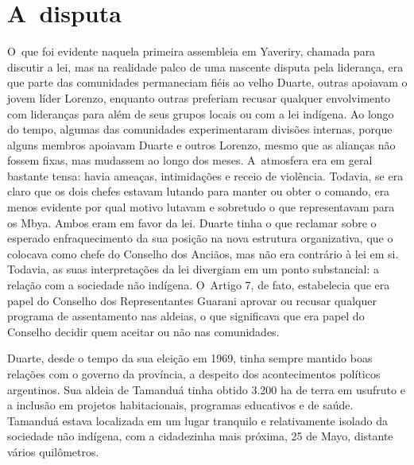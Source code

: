 \section{A~disputa}

O~que foi evidente naquela primeira assembleia em Yaveriry, chamada para
discutir a lei, mas na realidade palco de uma nascente disputa pela
liderança, era que parte das comunidades permaneciam fiéis ao velho
Duarte, outras apoiavam o jovem líder Lorenzo, enquanto outras
preferiam recusar qualquer envolvimento com lideranças para além de
seus grupos locais ou com a lei indígena. Ao longo do tempo, algumas
das comunidades experimentaram divisões internas, porque alguns membros
apoiavam Duarte e outros Lorenzo, mesmo que as alianças não fossem
fixas, mas mudassem ao longo dos meses. A~atmosfera era em geral
bastante tensa: havia ameaças, intimidações e receio de violência.
Todavia, se era claro que os dois chefes estavam lutando para manter ou
obter o comando, era menos evidente por qual motivo lutavam e sobretudo
o que representavam para os Mbya. Ambos eram em favor da lei. Duarte
tinha o que reclamar sobre o esperado enfraquecimento da sua posição na
nova estrutura organizativa, que o colocava como chefe do Conselho dos
Anciãos, mas não era contrário à lei em si. Todavia, as suas
interpretações da lei divergiam em um ponto substancial: a relação com
a sociedade não indígena. O~Artigo 7, de fato, estabelecia que era
papel do Conselho dos Representantes Guarani aprovar ou recusar
qualquer programa de assentamento nas aldeias, o que significava que
era papel do Conselho decidir quem aceitar ou não nas comunidades.

Duarte, desde o tempo da sua eleição em 1969, tinha sempre mantido boas
relações com o governo da província, a despeito dos acontecimentos
políticos argentinos. Sua aldeia de Tamanduá tinha obtido 3.200 ha de
terra em usufruto e a inclusão em projetos habitacionais, programas
educativos e de saúde. Tamanduá estava localizada em um lugar tranquilo
e relativamente isolado da sociedade não indígena, com a cidadezinha
mais próxima, 25 de Mayo, distante vários quilômetros. 

